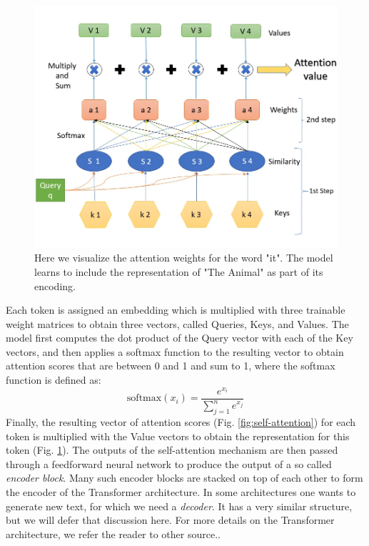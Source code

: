 \begin{figure}[h]
    \includegraphics[width=\linewidth]{chapters/NLP/figures/queries_keys_values.png}
    \caption{Here we visualize the attention weights for the word "it". The model learns to include the representation of "The Animal" as part of its encoding.}
    \label{fig:queries-keys-values}
\end{figure}
Each token is assigned an embedding which is multiplied with three trainable weight matrices to obtain three vectors, called Queries, Keys, and Values.
The model first computes the dot product of the Query vector with each of the Key vectors, and then applies a softmax function to the resulting vector to obtain attention scores that are between 0 and 1 and sum to 1, where the softmax function is defined as:
\begin{equation}
    \text{softmax}(x_i) = \frac{e^{x_i}}{\sum_{j=1}^{n} e^{x_j}}
\end{equation}
Finally, the resulting vector of attention scores (Fig. \ref{fig:self-attention}) for each token is multiplied with the Value vectors to obtain the representation for this token (Fig. \ref{fig:queries-keys-values}).
The outputs of the self-attention mechanism are then passed through a feedforward neural network to produce the output of a so called \textit{encoder block}.
Many such encoder blocks are stacked on top of each other to form the encoder of the Transformer architecture.
In some architectures one wants to generate new text, for which we need a \textit{decoder}.
It has a very similar structure, but we will defer that discussion here.
For more details on the Transformer architecture, we refer the reader to other source.\cite{https://doi.org/10.48550/arxiv.1706.03762}\cite{illustratedtransformer}.

